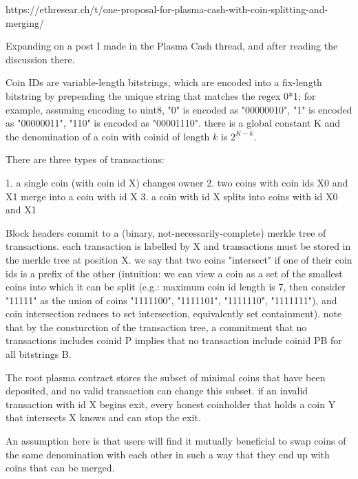 \documentclass{article}
\begin{document}
https://ethresear.ch/t/one-proposal-for-plasma-cash-with-coin-splitting-and-merging/

Expanding on a post I made in the Plasma Cash thread, and after reading the discussion there.

Coin IDs are variable-length bitstrings, which are encoded into a fix-length bitstring by prepending the unique string that matches the regex 0*1; for example, assuming encoding to uint8, "0" is encoded as "00000010", "1" is encoded as "00000011", "110" is encoded as "00001110". there is a global constant K and the denomination of a coin with coinid of length $k$ is $2^{K-k}$.

There are three types of transactions:

1. a single coin (with coin id X) changes owner
2. two coins with coin ids X0 and X1 merge into a coin with id X
3. a coin with id X splits into coins with id X0 and X1

Block headers commit to a (binary, not-necessarily-complete) merkle tree of transactions. each transaction is labelled by X and transactions must be stored in the merkle tree at position X. we say that two coins "intersect" if one of their coin ids is a prefix of the other (intuition: we can view a coin as a set of the smallest coins into which it can be split (e.g.: maximum coin id length is 7, then consider "11111" as the union of coins {"1111100", "1111101", "1111110", "1111111"}), and coin intersection reduces to set intersection, equivalently set containment). note that by the consturction of the transaction tree, a commitment that no transactions includes coinid P implies that no transaction include coinid PB for all bitstrings B.

The root plasma contract stores the subset of minimal coins that have been deposited, and no valid transaction can change this subset. if an invalid transaction with id X begins exit, every honest coinholder that holds a coin Y that intersects X knows and can stop the exit.

An assumption here is that users will find it mutually beneficial to swap coins of the same denomination with each other in such a way that they end up with coins that can be merged.
\end{document}
